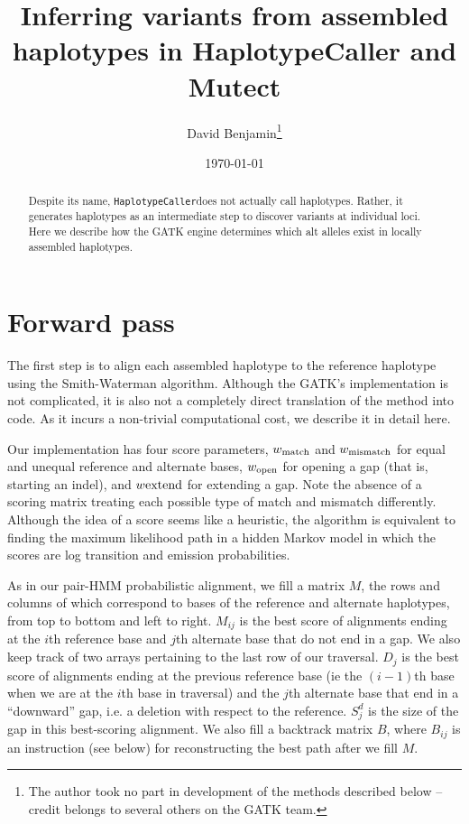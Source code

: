\documentclass[nofootinbib,amssymb,amsmath]{revtex4}
\newcommand{\HC}{\texttt{HaplotypeCaller}}
\begin{document}
\title{Inferring variants from assembled haplotypes in HaplotypeCaller and Mutect}
\author{David Benjamin\footnote{The author took no part in development of the methods described below -- credit belongs to several others on the GATK team. }}

\date{\today}

\begin{abstract}
Despite its name, \HC does not actually call haplotypes.  Rather, it generates haplotypes as an intermediate step to discover variants at individual loci.  Here we describe how the GATK engine determines which alt alleles exist in locally assembled haplotypes.
\end{abstract}

\maketitle

\section{Forward pass}
The first step is to align each assembled haplotype to the reference haplotype using the Smith-Waterman algorithm.  Although the GATK's implementation is not complicated, it is also not a completely direct translation of the method into code.  As it incurs a non-trivial computational cost, we describe it in detail here.

Our implementation has four score parameters, $w_{\rm match}$ and $w_{\rm mismatch}$ for equal and unequal reference and alternate bases, $w_{\rm open}$ for opening a gap (that is, starting an indel), and $w{\rm extend}$ for extending a gap.  Note the absence of a scoring matrix treating each possible type of match and mismatch differently.  Although the idea of a score seems like a heuristic, the algorithm is equivalent to finding the maximum likelihood path in a hidden Markov model in which the scores are log transition and emission probabilities.  

As in our pair-HMM probabilistic alignment, we fill a matrix $M$, the rows and columns of which correspond to bases of the reference and alternate haplotypes, from top to bottom and left to right.  $M_{ij}$ is the best score of alignments ending at the $i$th reference base and $j$th alternate base that do not end in a gap.  We also keep track of two arrays pertaining to the last row of our traversal.  $D_j$ is the best score of alignments ending at the previous reference base (ie the $(i-1)$th base when we are at the $i$th base in traversal) and the $j$th alternate base that end in a ``downward'' gap, i.e. a deletion with respect to the reference.  $S^d_j$ is the size of the gap in this best-scoring alignment.  We also fill a backtrack matrix $B$, where $B_{ij}$ is an instruction (see below) for reconstructing the best path after we fill $M$.
\end{document}
